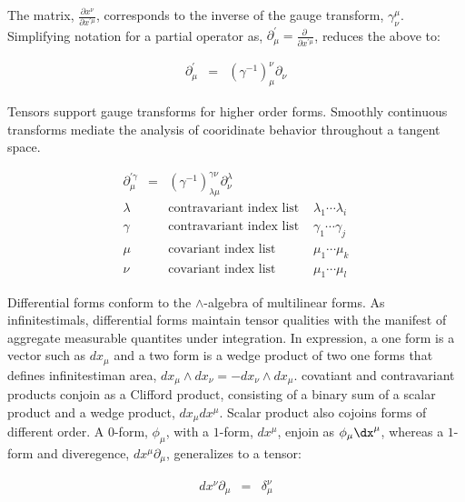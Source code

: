 \documentclass[aps,twocolumn,secnumarabic,nobalancelastpage,amsmath,amssymb,
amsthm,nofootinbib,parskip=full]{revtex4}
\numberwithin{equation}{section}
\newcommand{\pa}[1]{\left(#1\right)}
\begin{document}
The matrix, $\frac{\partial x^\nu}{\partial x^{\prime\mu}}$,
corresponds to the inverse of the gauge transform, $\gamma^\mu_\nu$.
Simplifying notation for a partial operator as,
$\partial^{\prime}_\mu=\frac{\partial\;}{\partial x^{\prime\mu}}$,
reduces the above to:

\begin{equation*}
\begin{array}{rcl}
\partial^{\prime}_\mu&=&\pa{\gamma^{-1}}^\nu_\mu\partial_\nu
\end{array}
\end{equation*}

Tensors support gauge transforms for higher order forms.
Smoothly continuous transforms mediate the analysis of cooridinate
behavior throughout a tangent space.

\begin{equation*}
\begin{array}{rcll}
\partial^{\prime\gamma}_\mu&=&
          \pa{\gamma^{-1}}^{\gamma\nu}_{\lambda\mu}\partial^\lambda_\nu & \\[11pt]
\lambda&&\text{contravariant index list }&\lambda_1\cdots\lambda_i \\[5pt]
\gamma&&\text{contravariant index list }&\gamma_1\cdots\gamma_j \\[5pt]
\mu&&\text{covariant index list }&\mu_1\cdots\mu_k \\[5pt]
\nu&&\text{covariant index list }&\mu_1\cdots\mu_l
\end{array}
\end{equation*}

Differential forms conform to the $\wedge$-algebra of multilinear forms.
As infinitestimals, differential forms maintain tensor qualities
with the manifest of aggregate measurable quantites under integration.
In expression, a one form is a vector such as $dx_\mu$ and a
two form is a wedge product of two one forms that defines infinitestiman area,
$dx_\mu\wedge dx_\nu=-dx_\nu\wedge dx_\mu$.
covatiant and contravariant products conjoin as a Clifford product,
consisting of a binary sum of a scalar product and a wedge product,
$dx_\mu dx^\mu$. Scalar product also cojoins forms of different order.
A $0$-form, $\phi_\mu$, with a $1$-form, $dx^\mu$, enjoin as $\phi_\mu\dx^\mu$,
whereas a $1$-form and diveregence, $dx^\mu\partial_\mu$,
generalizes to a tensor:

\begin{equation*}
\begin{array}{rcl}
dx^\nu\partial_\mu&=&\delta^\nu_\mu
\end{array}
\end{equation*}
\end{document}
